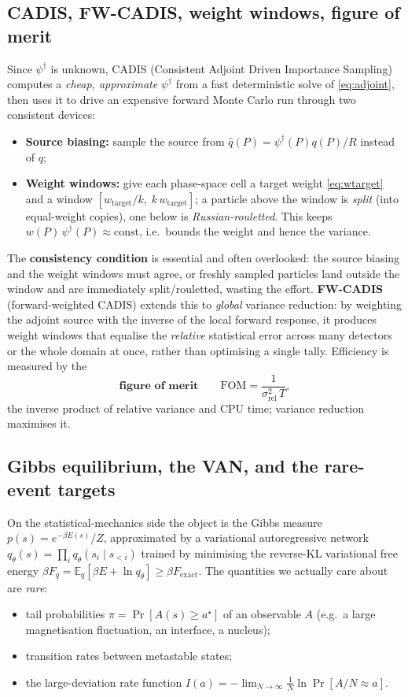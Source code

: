 \documentclass[11pt]{article}
\newcommand{\dg}{^{\dagger}}
\newcommand{\E}{\mathbb{E}}
\begin{document}
\subsection{CADIS, FW-CADIS, weight windows, figure of merit}
Since $\psi\dg$ is unknown, CADIS (Consistent Adjoint Driven Importance Sampling) computes a
\emph{cheap, approximate} $\psi\dg$ from a fast deterministic solve of \eqref{eq:adjoint},
then uses it to drive an expensive forward Monte Carlo run through two consistent devices:
\begin{itemize}
\item \textbf{Source biasing:} sample the source from $\hat q(P)=\psi\dg(P)q(P)/R$ instead of $q$;
\item \textbf{Weight windows:} give each phase-space cell a target weight
\eqref{eq:wtarget} and a window $[w_{\text{target}}/k,\;k\,w_{\text{target}}]$; a particle
above the window is \emph{split} (into equal-weight copies), one below is
\emph{Russian-rouletted}. This keeps $w(P)\,\psi\dg(P)\approx\text{const}$, i.e.\ bounds the
weight and hence the variance.
\end{itemize}
The \textbf{consistency condition} is essential and often overlooked: the source biasing and
the weight windows must agree, or freshly sampled particles land outside the window and are
immediately split/rouletted, wasting the effort. \textbf{FW-CADIS} (forward-weighted CADIS)
extends this to \emph{global} variance reduction: by weighting the adjoint source with the
inverse of the local forward response, it produces weight windows that equalise the
\emph{relative} statistical error across many detectors or the whole domain at once, rather
than optimising a single tally. Efficiency is measured by the
\begin{equation}
\textbf{figure of merit}\qquad \mathrm{FOM}=\frac{1}{\sigma_{\mathrm{rel}}^2\,T},
\end{equation}
the inverse product of relative variance and CPU time; variance reduction maximises it.

\subsection{Gibbs equilibrium, the VAN, and the rare-event targets}
On the statistical-mechanics side the object is the Gibbs measure
$p(s)=e^{-\beta E(s)}/Z$, approximated by a variational autoregressive network
$q_\theta(s)=\prod_i q_\theta(s_i\mid s_{<i})$ trained by minimising the reverse-KL
variational free energy $\beta F_q=\E_{q}[\beta E+\ln q_\theta]\ge\beta F_{\text{exact}}$.
The quantities we actually care about are \emph{rare}:
\begin{itemize}
\item tail probabilities $\pi=\Pr[A(s)\ge a^\star]$ of an observable $A$ (e.g.\ a large
magnetisation fluctuation, an interface, a nucleus);
\item transition rates between metastable states;
\item the large-deviation rate function $I(a)=-\lim_{N\to\infty}\tfrac1N\ln\Pr[A/N\approx a]$.
\end{itemize}
\end{document}
